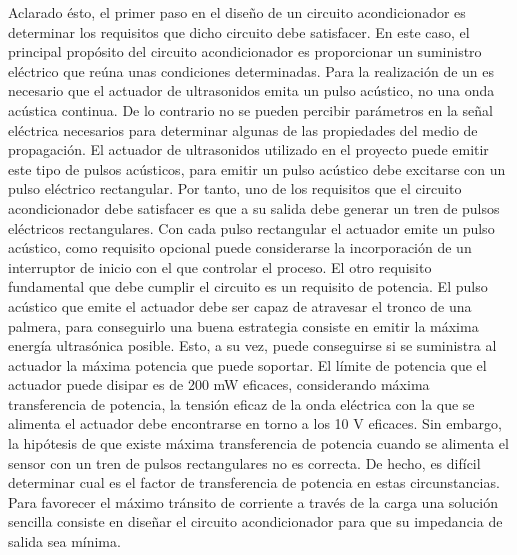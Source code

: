 Aclarado ésto, el primer paso en el diseño de un circuito acondicionador es
determinar los requisitos que dicho circuito debe satisfacer. En este caso,
el principal propósito del circuito acondicionador es proporcionar un
suministro eléctrico que reúna unas condiciones determinadas. Para la
realización de un  es necesario que el actuador de ultrasonidos
emita un pulso acústico, no una onda acústica continua. De lo contrario no
se pueden percibir parámetros en la señal eléctrica necesarios para
determinar algunas de las propiedades del medio de propagación. El actuador
de ultrasonidos utilizado en el proyecto puede emitir este tipo de pulsos
acústicos, para emitir un pulso acústico debe excitarse con un pulso
eléctrico rectangular. Por tanto, uno de los requisitos que el circuito
acondicionador debe satisfacer es que a su salida debe generar un tren de
pulsos eléctricos rectangulares. Con cada pulso rectangular el actuador
emite un pulso acústico, como requisito opcional puede considerarse la
incorporación de un interruptor de inicio con el que controlar el proceso.
El otro requisito fundamental que debe cumplir el circuito es un requisito
de potencia. El pulso acústico que emite el actuador debe ser capaz de
atravesar el tronco de una palmera, para conseguirlo una buena estrategia
consiste en emitir la máxima energía ultrasónica posible. Esto, a su vez,
puede conseguirse si se suministra al actuador la máxima potencia que puede
soportar. El límite de potencia que el actuador puede disipar es de 200 mW
eficaces, considerando máxima transferencia de potencia, la tensión eficaz
de la onda eléctrica con la que se alimenta el actuador debe encontrarse en
torno a los 10 V eficaces. Sin embargo, la hipótesis de que existe máxima
transferencia de potencia cuando se alimenta el sensor con un tren de
pulsos rectangulares no es correcta. De hecho, es difícil determinar cual
es el factor de transferencia de potencia en estas circunstancias. Para
favorecer el máximo tránsito de corriente a través de la carga una solución
sencilla consiste en diseñar el circuito acondicionador para que su
impedancia de salida sea mínima.

